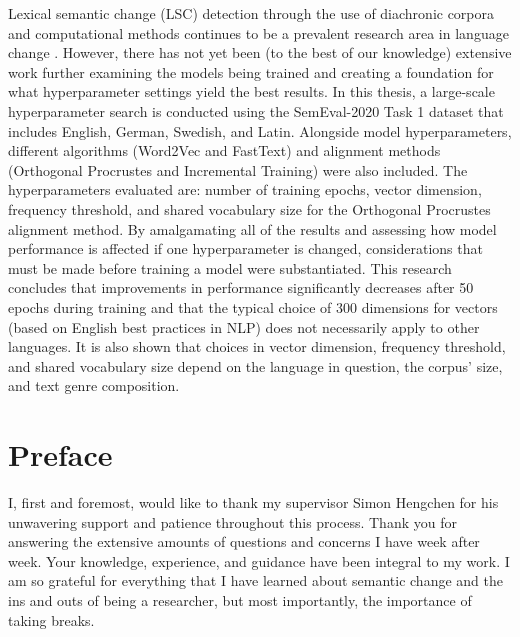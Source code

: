 \documentclass[11pt, a4paper]{article}
\begin{document}
Lexical semantic change (LSC) detection through the use of diachronic corpora and computational methods continues to be a prevalent research area in language change \citep{tahmasebi-survey2018}. However, there has not yet been (to the best of our knowledge) extensive work further examining the models being trained and creating a foundation for what hyperparameter settings yield the best results. In this thesis, a large-scale hyperparameter search is conducted using the SemEval-2020 Task 1 dataset that includes English, German, Swedish, and Latin. Alongside model hyperparameters, different algorithms (Word2Vec and FastText) and alignment methods (Orthogonal Procrustes and Incremental Training) were also included. The hyperparameters evaluated are: number of training epochs, vector dimension, frequency threshold, and shared vocabulary size for the Orthogonal Procrustes alignment method. By amalgamating all of the results and assessing how model performance is affected if one hyperparameter is changed, considerations that must be made before training a model were substantiated. This research concludes that improvements in performance significantly decreases after 50 epochs during training and that the typical choice of 300 dimensions for vectors (based on English best practices in NLP) does not necessarily apply to other languages. It is also shown that choices in vector dimension, frequency threshold, and shared vocabulary size depend on the language in question, the corpus' size, and text genre composition. 



\thispagestyle{empty}

\newpage
\section*{Preface}

I, first and foremost, would like to thank my supervisor Simon Hengchen for his unwavering support and patience throughout this process. Thank you for answering the extensive amounts of questions and concerns I have week after week. Your knowledge, experience, and guidance have been integral to my work. I am so grateful for everything that I have learned about semantic change and the ins and outs of being a researcher, but most importantly, the importance of taking breaks. 
\end{document}
